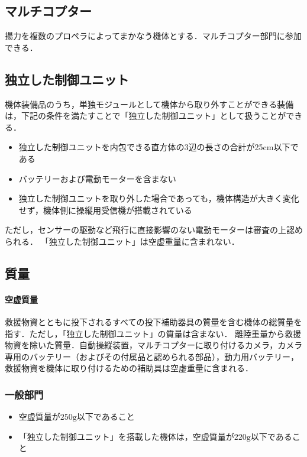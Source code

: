 \documentclass[a4paper,12pt,oneside]{jsarticle}
\begin{document}
\subsection{マルチコプター}
揚力を複数のプロペラによってまかなう機体とする．マルチコプター部門に参加できる．

\subsection{独立した制御ユニット}
機体装備品のうち，単独モジュールとして機体から取り外すことができる装備は，下記の条件を満たすことで「独立した制御ユニット」として扱うことができる．
\begin{itemize}
  \item 独立した制御ユニットを内包できる直方体の3辺の長さの合計が25cm以下である
  \item バッテリーおよび電動モーターを含まない
  \item 独立した制御ユニットを取り外した場合であっても，機体構造が大きく変化せず，機体側に操縦用受信機が搭載されている
\end{itemize}
ただし，センサーの駆動など飛行に直接影響のない電動モーターは審査の上認められる．
「独立した制御ユニット」は空虚重量に含まれない．

\subsection{質量}
\paragraph{空虚質量} 救援物資とともに投下されるすべての投下補助器具の質量を含む機体の総質量を指す．ただし，「独立した制御ユニット」の質量は含まない．\newline
離陸重量から救援物資を除いた質量．自動操縦装置，マルチコプターに取り付けるカメラ，カメラ専用のバッテリー（およびその付属品と認められる部品），動力用バッテリー，救援物資を機体に取り付けるための補助具は空虚重量に含まれる．
\subsubsection{一般部門}
\begin{itemize}
  \item 空虚質量が$250\mathrm{g}$以下であること
  \item 「独立した制御ユニット」を搭載した機体は，空虚質量が$220\mathrm{g}$以下であること
\end{itemize}
\end{document}

